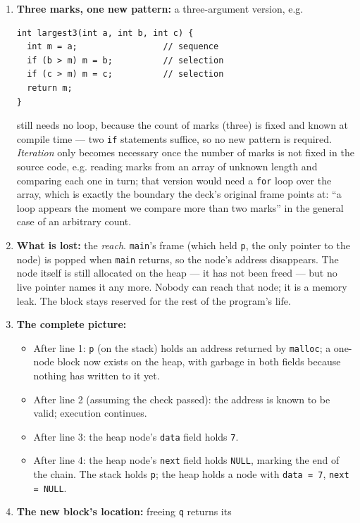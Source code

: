 \documentclass[11pt]{article}
\begin{document}
\begingroup\small
\begin{enumerate}
  \item \textbf{Three marks, one new pattern:} a three-argument version, e.g.
{\footnotesize
\begin{verbatim}
int largest3(int a, int b, int c) {
  int m = a;                 // sequence
  if (b > m) m = b;          // selection
  if (c > m) m = c;          // selection
  return m;
}
\end{verbatim}
}
    still needs no loop, because the count of marks (three) is fixed and known
    at compile time --- two \texttt{if} statements suffice, so no new pattern
    is required. \emph{Iteration} only becomes necessary once the number of
    marks is not fixed in the source code, e.g. reading marks from an array of
    unknown length and comparing each one in turn; that version would need a
    \texttt{for} loop over the array, which is exactly the boundary the deck's
    original frame points at: ``a loop appears the moment we compare more than
    two marks'' in the general case of an arbitrary count.
  \item \textbf{What is lost:} the \emph{reach}. \texttt{main}'s frame (which
    held \texttt{p}, the only pointer to the node) is popped when
    \texttt{main} returns, so the node's address disappears. The node itself is
    still allocated on the heap --- it has not been freed --- but no live
    pointer names it any more. Nobody can reach that node; it is a memory leak.
    The block stays reserved for the rest of the program's life.
  \item \textbf{The complete picture:}
    \begin{itemize}
      \item After line 1: \texttt{p} (on the stack) holds an address returned by
        \texttt{malloc}; a one-node block now exists on the heap, with garbage
        in both fields because nothing has written to it yet.
      \item After line 2 (assuming the check passed): the address is known to be
        valid; execution continues.
      \item After line 3: the heap node's \texttt{data} field holds \texttt{7}.
      \item After line 4: the heap node's \texttt{next} field holds
        \texttt{NULL}, marking the end of the chain. The stack holds \texttt{p};
        the heap holds a node with \texttt{data = 7}, \texttt{next = NULL}.
    \end{itemize}
  \item \textbf{The new block's location:} freeing \texttt{q} returns its

\end{enumerate}
\end{document}
